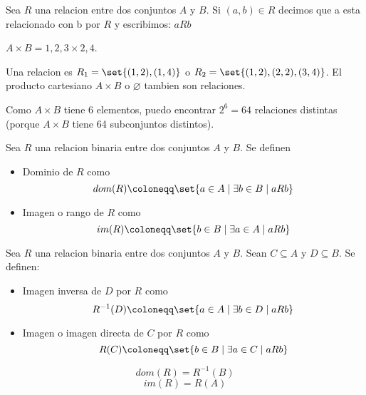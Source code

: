 Sea \(R \) una relacion entre dos conjuntos \(A \) y \(B \). Si \((a,b) \in R \) decimos que a esta relacionado con b por \(R \) y escribimos: \(a R b\)

\begin{example}
	\(A \times B = {1,2,3} \times {2,4}\).

	Una relacion es \(R_1 = \set{(1,2),(1,4 )}\) o \(R_2 = \set{(1,2), (2,2), (3,4)}\).
	El producto cartesiano \(A \times B \) o \(\varnothing\) tambien son relaciones.
\end{example}

\begin{remark}
	Como \(A \times B \) tiene \(6 \) elementos, puedo encontrar \(2^{6} = 64 \) relaciones distintas (porque \(A \times B \) tiene 64 subconjuntos distintos).
\end{remark}


\begin{definition}
	Sea \(R \) una relacion binaria entre dos conjuntos \(A \) y \(B \). Se definen
	\begin{itemize}
		\item Dominio de \(R \) como
		      \[
			      dom(R) \coloneqq \set{a \in  A \mid \exists b \in B \mid a R b}
		      \]
		\item Imagen o rango de \( R \) como
		      \[
			      im(R) \coloneqq \set{ b \in B \mid \exists a \in  A \mid a R b}
		      \]
	\end{itemize}
\end{definition}

\begin{definition}
	Sea \(R \) una relacion binaria entre dos conjuntos \(A \) y \(B \). Sean \(C \subseteq A \) y \(D \subseteq B \). Se definen:
	\begin{itemize}
		\item Imagen inversa de \(D \) por \(R \) como
		      \[
			      R^{-1}(D) \coloneqq \set{a \in  A \mid \exists  b \in  D \mid a R b}
		      \]
		\item Imagen o imagen directa de \(C \) por \(R \) como
		      \[
			      R(C) \coloneqq \set{b \in B \mid \exists a \in  C \mid aRb}
		      \]
	\end{itemize}
\end{definition}
\begin{remark}
	\[
		dom(R) = R^{-1}(B)
	\]
	\[
		im(R) = R(A)
	\]
\end{remark}

